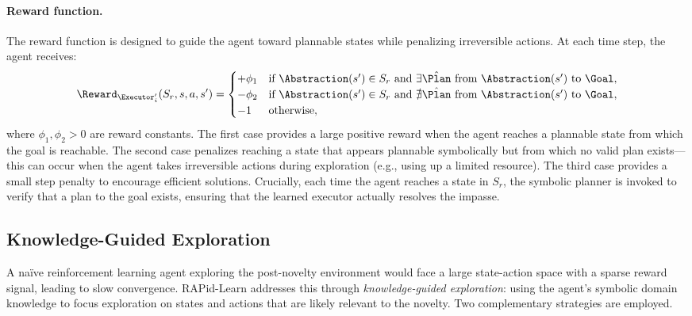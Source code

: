 

\paragraph{Reward function.} The reward function is designed to guide the agent toward plannable states while penalizing irreversible actions. At each time step, the agent receives:
\[
\Reward_{\Executor'_i}(S_r, s, a, s') =
\begin{cases}
+\phi_1 & \text{if } \Abstraction(s') \in S_r \text{ and } \exists \hat{\Plan} \text{ from } \Abstraction(s') \text{ to } \Goal, \\
-\phi_2 & \text{if } \Abstraction(s') \in S_r \text{ and } \nexists \hat{\Plan} \text{ from } \Abstraction(s') \text{ to } \Goal, \\
-1 & \text{otherwise},
\end{cases}
\]
where $\phi_1, \phi_2 > 0$ are reward constants. The first case provides a large positive reward when the agent reaches a plannable state from which the goal is reachable. The second case penalizes reaching a state that appears plannable symbolically but from which no valid plan exists---this can occur when the agent takes irreversible actions during exploration (e.g., using up a limited resource). The third case provides a small step penalty to encourage efficient solutions. Crucially, each time the agent reaches a state in $S_r$, the symbolic planner is invoked to verify that a plan to the goal exists, ensuring that the learned executor actually resolves the impasse.

\subsection{Knowledge-Guided Exploration}
\label{sec:kge}

A na\"ive reinforcement learning agent exploring the post-novelty environment would face a large state-action space with a sparse reward signal, leading to slow convergence. RAPid-Learn addresses this through \emph{knowledge-guided exploration}: using the agent's symbolic domain knowledge to focus exploration on states and actions that are likely relevant to the novelty. Two complementary strategies are employed.

